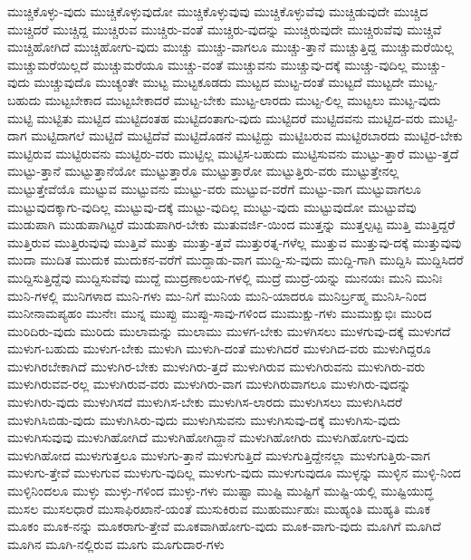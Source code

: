 {ಮುಚ್ಚಿಕೊಳ್ಳು-ವುದು
ಮುಚ್ಚಿಕೊಳ್ಳುವುದೋ
ಮುಚ್ಚಿಕೊಳ್ಳುವುವು
ಮುಚ್ಚಿಕೊಳ್ಳುವೆವು
ಮುಚ್ಚಿಡುವುದೇ
ಮುಚ್ಚಿದ
ಮುಚ್ಚಿದರೆ
ಮುಚ್ಚಿದ್ದ
ಮುಚ್ಚಿರುವ
ಮುಚ್ಚಿರು-ವಂತೆ
ಮುಚ್ಚಿರು-ವುದನ್ನು
ಮುಚ್ಚಿರುವುದೇ
ಮುಚ್ಚಿರುವೆವು
ಮುಚ್ಚಿವೆ
ಮುಚ್ಚಿಹೋಗಿದೆ
ಮುಚ್ಚಿಹೋಗು-ವುದು
ಮುಚ್ಚು
ಮುಚ್ಚು-ವಾಗಲೂ
ಮುಚ್ಚು-ತ್ತಾನೆ
ಮುಚ್ಚುತ್ತಿದ್ದ
ಮುಚ್ಚುಮರೆಯಿಲ್ಲ
ಮುಚ್ಚುಮರೆಯಿಲ್ಲದೆ
ಮುಚ್ಚುಮರೆಯೂ
ಮುಚ್ಚು-ವಂತೆ
ಮುಚ್ಚುವನು
ಮುಚ್ಚುವು-ದಕ್ಕೆ
ಮುಚ್ಚು-ವುದಿಲ್ಲ
ಮುಚ್ಚು-ವುದು
ಮುಚ್ಚುವುದೊ
ಮುಚ್ಯಂತೇ
ಮುಟ್ಟ
ಮುಟ್ಟಕೂಡದು
ಮುಟ್ಟದ
ಮುಟ್ಟ-ದಂತೆ
ಮುಟ್ಟದೆ
ಮುಟ್ಟದೇ
ಮುಟ್ಟ-ಬಹುದು
ಮುಟ್ಟಬೇಕಾದ
ಮುಟ್ಟಬೇಕಾದರೆ
ಮುಟ್ಟ-ಬೇಕು
ಮುಟ್ಟ-ಲಾರದು
ಮುಟ್ಟ-ಲಿಲ್ಲ
ಮುಟ್ಟಲು
ಮುಟ್ಟ-ವುದು
ಮುಟ್ಟಿ
ಮುಟ್ಟಿತು
ಮುಟ್ಟಿದ
ಮುಟ್ಟಿದಂತಹ
ಮುಟ್ಟಿದಂತಾಗು-ವುದು
ಮುಟ್ಟಿದರೆ
ಮುಟ್ಟಿದವನು
ಮುಟ್ಟಿದ-ವರು
ಮುಟ್ಟಿ-ದಾಗ
ಮುಟ್ಟಿದಾಗಲೆ
ಮುಟ್ಟಿದೆ
ಮುಟ್ಟಿದೆವೆ
ಮುಟ್ಟಿದೊಡನೆ
ಮುಟ್ಟಿದ್ದು
ಮುಟ್ಟಿಬರುವ
ಮುಟ್ಟಿರಬಾರದು
ಮುಟ್ಟಿರ-ಬೇಕು
ಮುಟ್ಟಿರುವ
ಮುಟ್ಟಿರುವನು
ಮುಟ್ಟಿರು-ವರು
ಮುಟ್ಟಿಲ್ಲ
ಮುಟ್ಟಿಸ-ಬಹುದು
ಮುಟ್ಟಿಸುವನು
ಮುಟ್ಟು-ತ್ತಾರೆ
ಮುಟ್ಟು-ತ್ತದೆ
ಮುಟ್ಟು-ತ್ತಾನೆ
ಮುಟ್ಟುತ್ತಾನೆಯೋ
ಮುಟ್ಟುತ್ತಾರೊ
ಮುಟ್ಟುತ್ತಾರೋ
ಮುಟ್ಟುತ್ತಿರು-ವರು
ಮುಟ್ಟುತ್ತೇನಲ್ಲ
ಮುಟ್ಟುತ್ತೇವೆಯೊ
ಮುಟ್ಟುವ
ಮುಟ್ಟುವನು
ಮುಟ್ಟು-ವರು
ಮುಟ್ಟುವ-ವರೆಗೆ
ಮುಟ್ಟು-ವಾಗ
ಮುಟ್ಟುವಾಗಲೂ
ಮುಟ್ಟುವುದಕ್ಕಾಗು-ವುದಿಲ್ಲ
ಮುಟ್ಟುವು-ದಕ್ಕೆ
ಮುಟ್ಟು-ವುದಿಲ್ಲ
ಮುಟ್ಟು-ವುದು
ಮುಟ್ಟುವುದೋ
ಮುಟ್ಟುವೆವು
ಮುಡುಪಾಗಿ
ಮುಡುಪಾಗಿಟ್ಟರೆ
ಮುಡುಪಾಗಿರ-ಬೇಕು
ಮುತುವರ್ಜಿ-ಯಿಂದ
ಮುತ್ತನ್ನು
ಮುತ್ತಲ್ಪಟ್ಟ
ಮುತ್ತಿ
ಮುತ್ತಿದ್ದರೆ
ಮುತ್ತಿರುವ
ಮುತ್ತಿರುವುವು
ಮುತ್ತಿವೆ
ಮುತ್ತು
ಮುತ್ತು-ತ್ತವೆ
ಮುತ್ತುರತ್ನ-ಗಳೆಲ್ಲ
ಮುತ್ತುವ
ಮುತ್ತುವು-ದಕ್ಕೆ
ಮುತ್ತುವುವು
ಮುದಾ
ಮುದಿತ
ಮುದುಕ
ಮುದುಕನ-ವರೆಗೆ
ಮುದ್ದಾಡು-ವಾಗ
ಮುದ್ದಿ-ಸು-ವುದು
ಮುದ್ದಿ-ಗಾಗಿ
ಮುದ್ದಿಸಿ
ಮುದ್ದಿಸಿದರೆ
ಮುದ್ದಿಸುತ್ತಿದ್ದೆವು
ಮುದ್ದಿಸುವೆವು
ಮುದ್ದೆ
ಮುದ್ರಣಾಲಯ-ಗಳಲ್ಲಿ
ಮುದ್ರೆ
ಮುದ್ರೆ-ಯನ್ನು
ಮುನಯಃ
ಮುನಿ
ಮುನಿಃ
ಮುನಿ-ಗಳಲ್ಲಿ
ಮುನಿಗಳಾದ
ಮುನಿ-ಗಳು
ಮು-ನಿಗೆ
ಮುನಿಯ
ಮುನಿ-ಯಾದರೂ
ಮುನಿರ್ಬ್ರಹ್ಮ
ಮುನಿಸಿ-ನಿಂದ
ಮುನೀನಾಮಪ್ಯಹಂ
ಮುನೇಃ
ಮುನ್ನ
ಮುಪ್ಪು
ಮುಪ್ಪು-ಸಾವು-ಗಳಿಂದ
ಮುಮುಕ್ಷು-ಗಳು
ಮುಮುಕ್ಷುಭಿಃ
ಮುರಿದ
ಮುರಿದಿರು-ವುದು
ಮುರಿದು
ಮುಲಾಮನ್ನು
ಮುಲಾಮು
ಮುಳಗ-ಬೇಕು
ಮುಳಗಿಸಲು
ಮುಳಗುವು-ದಕ್ಕೆ
ಮುಳುಗದೆ
ಮುಳುಗ-ಬಹುದು
ಮುಳುಗ-ಬೇಕು
ಮುಳುಗಿ
ಮುಳುಗಿ-ದಂತೆ
ಮುಳುಗಿದರೆ
ಮುಳುಗಿದ-ವರು
ಮುಳುಗಿದ್ದರೂ
ಮುಳುಗಿರಬೇಕಾಗಿದೆ
ಮುಳುಗಿರ-ಬೇಕು
ಮುಳುಗಿರು-ತ್ತದೆ
ಮುಳುಗಿರುವ
ಮುಳುಗಿರುವನು
ಮುಳುಗಿರು-ವರು
ಮುಳುಗಿರುವವ-ರಲ್ಲ
ಮುಳುಗಿರುವ-ವರು
ಮುಳುಗಿರು-ವಾಗ
ಮುಳುಗಿರುವಾಗಲೂ
ಮುಳುಗಿರು-ವುದನ್ನು
ಮುಳುಗಿರು-ವುದು
ಮುಳುಗಿಸದೆ
ಮುಳುಗಿಸ-ಬೇಕು
ಮುಳುಗಿಸ-ಲಾರದು
ಮುಳುಗಿಸಲು
ಮುಳುಗಿಸಿದರೆ
ಮುಳುಗಿಸಿಬಿಡು-ವುದು
ಮುಳುಗಿಸಿರು-ವುದು
ಮುಳುಗಿಸುವನು
ಮುಳುಗಿಸುವು-ದಕ್ಕೆ
ಮುಳುಗಿಸು-ವುದು
ಮುಳುಗಿಸುವುವು
ಮುಳುಗಿಹೋಗಿದೆ
ಮುಳುಗಿಹೋಗಿದ್ದಾನೆ
ಮುಳುಗಿಹೋಗಿರು
ಮುಳುಗಿಹೋಗು-ವುದು
ಮುಳುಗಿಹೋದ
ಮುಳುಗುತ್ತಲೂ
ಮುಳುಗು-ತ್ತಾನೆ
ಮುಳುಗುತ್ತಿದೆ
ಮುಳುಗುತ್ತಿದ್ದೇನಲ್ಲಾ
ಮುಳುಗುತ್ತಿರು-ವಾಗ
ಮುಳುಗು-ತ್ತೇವೆ
ಮುಳುಗುವ
ಮುಳುಗು-ವುದಿಲ್ಲ
ಮುಳುಗು-ವುದು
ಮುಳುಗುವುದೂ
ಮುಳ್ಳನ್ನು
ಮುಳ್ಳಿನ
ಮುಳ್ಳಿ-ನಿಂದ
ಮುಳ್ಳಿನಿಂದಲೂ
ಮುಳ್ಳು
ಮುಳ್ಳು-ಗಳಿಂದ
ಮುಳ್ಳು-ಗಳು
ಮುಷ್ಟಾ
ಮುಷ್ಟಿ
ಮುಷ್ಟಿಗೆ
ಮುಷ್ಟಿ-ಯಲ್ಲಿ
ಮುಷ್ಟಿಯುದ್ಧ
ಮುಸಲ
ಮುಸಲಧಾರೆ
ಮುಸಾಫಿರಖಾನೆ-ಯಂತೆ
ಮುಸುಕಿರುವ
ಮುಹುರ್ಮುಹುಃ
ಮುಹ್ಯಂತಿ
ಮುಹ್ಯತಿ
ಮೂಕ
ಮೂಕಂ
ಮೂಕ-ನನ್ನು
ಮೂಕರಾಗು-ತ್ತೇವೆ
ಮೂಕವಾಗಿಹೋಗು-ವುದು
ಮೂಕ-ವಾಗು-ವುದು
ಮೂಗಿಗೆ
ಮೂಗಿದೆ
ಮೂಗಿನ
ಮೂಗಿ-ನಲ್ಲಿರುವ
ಮೂಗು
ಮೂಗುದಾರ-ಗಳು
}
